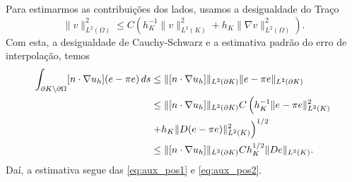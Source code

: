 \begin{dem}
Para estimarmos as contribuições dos lados, usamos a desigualdade do Traço\cite{Larson2013a}
\begin{equation}
  \|v\|_{L^2(\Omega)}^2 \leq C\left(h_K^{-1}\|v\|_{L^2(K)}^2 + h_K\|\nabla v\|_{L^2(\Omega)}^2\right).
\end{equation}
Com esta, a desigualdade de Cauchy-Schwarz e a estimativa padrão do erro de interpolação, temos
\begin{align}
  \int_{\partial K\setminus\partial\Omega} [n\cdot\nabla u_h](e-\pi e)\,ds &\leq \|[n\cdot\nabla u_h]\|_{L^2(\partial K)}\|e-\pi e\|_{L^2(\partial K)}\\
  &\leq \|[n\cdot\nabla u_h]\|_{L^2(\partial K)}C\left(h_K^{-1}\|e-\pi e\|_{L^2(K)}^2 \right.\nonumber\\
  &\left. + h_K\|D(e-\pi e)\|_{L^2(K)}^2\right)^{1/2}\\
  &\leq \|[n\cdot \nabla u_h]\|_{L^2(\partial K)}Ch_K^{1/2}\|De\|_{L^2(K)}.\label{eq:aux_pos2}
\end{align}
Daí, a estimativa segue das \eqref{eq:aux_pos1} e \eqref{eq:aux_pos2}.
\end{dem}